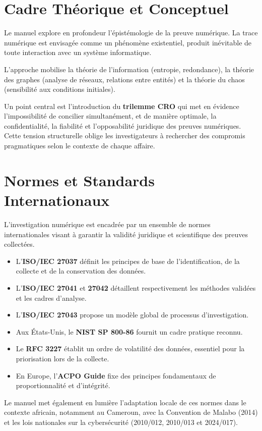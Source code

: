 \documentclass[12pt,a4paper]{article}
\begin{document}
\section{\centering \huge Cadre Théorique et Conceptuel}
{\Large Le manuel explore en profondeur l’épistémologie de la preuve numérique. La trace numérique est envisagée comme un phénomène existentiel, produit inévitable de toute interaction avec un système informatique.

L’approche mobilise la théorie de l’information (entropie, redondance), la théorie des graphes (analyse de réseaux, relations entre entités) et la théorie du chaos (sensibilité aux conditions initiales).

Un point central est l’introduction du \textbf{trilemme CRO} qui met en évidence l’impossibilité de concilier simultanément, et de manière optimale, la confidentialité, la fiabilité et l’opposabilité juridique des preuves numériques. Cette tension structurelle oblige les investigateurs à rechercher des compromis pragmatiques selon le contexte de chaque affaire.}

\section{\centering \huge Normes et Standards Internationaux}
{\Large L’investigation numérique est encadrée par un ensemble de normes internationales visant à garantir la validité juridique et scientifique des preuves collectées.
\begin{itemize}
	\item L’\textbf{ISO/IEC 27037} définit les principes de base de l’identification, de la collecte et de la conservation des données.
	\item L’\textbf{ISO/IEC 27041} et \textbf{27042} détaillent respectivement les méthodes validées et les cadres d’analyse.
	\item L’\textbf{ISO/IEC 27043} propose un modèle global de processus d’investigation.
	\item Aux États-Unis, le \textbf{NIST SP 800-86} fournit un cadre pratique reconnu.
	\item Le \textbf{RFC 3227} établit un ordre de volatilité des données, essentiel pour la priorisation lors de la collecte.
	\item En Europe, l’\textbf{ACPO Guide} fixe des principes fondamentaux de proportionnalité et d’intégrité.
\end{itemize}
Le manuel met également en lumière l’adaptation locale de ces normes dans le contexte africain, notamment au Cameroun, avec la Convention de Malabo (2014) et les lois nationales sur la cybersécurité (2010/012, 2010/013 et 2024/017).}
\end{document}
